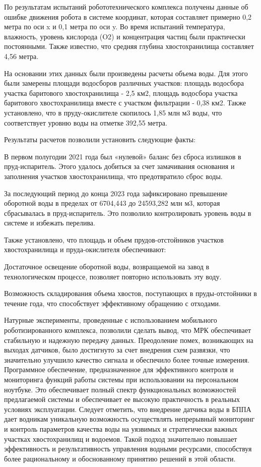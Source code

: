 \begin{multicols}{2}


По результатам испытаний робототехнического комплекса получены данные об
ошибке движения робота в системе координат, которая составляет примерно
0,2 метра по оси x и 0,1 метра по оси y. Во время испытаний температура,
влажность, уровень кислорода (O2) и концентрация частиц были практически
постоянными. Также известно, что средняя глубина хвостохранилища
составляет 4,56 метра.

На основании этих данных были произведены расчеты объема воды. Для этого
были замерены площади водосборов различных участков: площадь водосбора
участка баритового хвостохранилища - 2,5 км2, площадь водосбора участка
баритового хвостохранилища вместе с участком фильтрации - 0,38 км2.
Также установлено, что в пруду-окислителе скопилось 1,85 млн м3 воды,
что соответствует уровню воды на отметке 392,55 метра.

Результаты расчетов позволили установить следующие факты:

В первом полугодии 2021 года был «нулевой» баланс без сброса излишков в
пруд-испаритель. Этого удалось добиться за счет замачивания основания и
заполнения участков хвостохранилища, что предотвратило сброс воды.

За последующий период до конца 2023 года зафиксировано превышение
оборотной воды в пределах от 6704,443 до 24593,282 млн м3, которая
сбрасывалась в пруд-испаритель. Это позволило контролировать уровень
воды в системе и избежать перелива.

Также установлено, что площадь и объем прудов-отстойников участков
хвостохранилища и пруда-окислителя обеспечивают:

Достаточное освещение оборотной воды, возвращаемой на завод в
технологическом процессе, позволяет повторно использовать эту воду.

Возможность складирования объема хвостов, поступающих в пруды-отстойники
в течение года, что способствует эффективному обращению с отходами.

Натурные эксперименты, проведенные с использованием мобильного
роботизированного комплекса, позволили сделать вывод, что МРК
обеспечивает стабильную и надежную передачу данных. Преодоление помех,
возникающих на выходах датчиков, было достигнуто за счет внедрения схем
развязки, что значительно улучшило качество сигнала и обеспечило более
точные измерения. Программное обеспечение, предназначенное для
эффективного контроля и мониторинга функций работы системы при
использовании на персональном ноутбуке. Это обеспечивает полный спектр
функциональных возможностей предлагаемой системы и обеспечивает ее
высокую практичность в реальных условиях эксплуатации. Следует отметить,
что внедрение датчика воды в БППА дает водникам уникальную возможность
осуществлять непрерывный мониторинг и контроль параметров качества воды
на уязвимых и стратегически важных участках хвостохранилищ и водоемов.
Такой подход значительно повышает эффективность и результативность
управления водными ресурсами, способствуя более рациональному и
обоснованному принятию решений в этой области.


\end{multicols}
